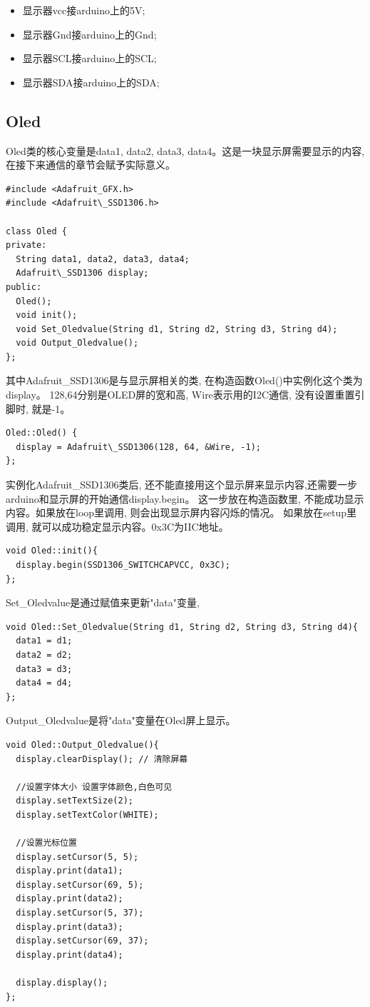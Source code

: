 \documentclass{article}
\begin{document}
\begin{itemize}
	\item 显示器vcc接arduino上的5V;
	\item 显示器Gnd接arduino上的Gnd;
	\item 显示器SCL接arduino上的SCL;
	\item 显示器SDA接arduino上的SDA;
\end{itemize}


\subsection{Oled}
Oled类的核心变量是data1, data2, data3, data4。这是一块显示屏需要显示的内容, 在接下来通信的章节会赋予实际意义。
\begin{lstlisting}
#include <Adafruit_GFX.h>
#include <Adafruit\_SSD1306.h>

class Oled {
private:
  String data1, data2, data3, data4;
  Adafruit\_SSD1306 display;
public:
  Oled();
  void init();
  void Set_Oledvalue(String d1, String d2, String d3, String d4);
  void Output_Oledvalue();
};
\end{lstlisting}

其中Adafruit\_SSD1306是与显示屏相关的类, 在构造函数Oled()中实例化这个类为display。
128,64分别是OLED屏的宽和高, Wire表示用的I2C通信, 没有设置重置引脚时, 就是-1。
\begin{lstlisting}
Oled::Oled() {
  display = Adafruit\_SSD1306(128, 64, &Wire, -1);
};  
\end{lstlisting}

实例化Adafruit\_SSD1306类后, 还不能直接用这个显示屏来显示内容,还需要一步arduino和显示屏的开始通信display.begin。
这一步放在构造函数里, 不能成功显示内容。如果放在loop里调用, 则会出现显示屏内容闪烁的情况。
如果放在setup里调用, 就可以成功稳定显示内容。0x3C为IIC地址。
\begin{lstlisting}
void Oled::init(){
  display.begin(SSD1306_SWITCHCAPVCC, 0x3C);
};  
\end{lstlisting}

Set\_Oledvalue是通过赋值来更新"data"变量,
\begin{lstlisting}
void Oled::Set_Oledvalue(String d1, String d2, String d3, String d4){
  data1 = d1;
  data2 = d2;
  data3 = d3;
  data4 = d4;
};  
\end{lstlisting}

Output\_Oledvalue是将"data"变量在Oled屏上显示。
\begin{lstlisting}
void Oled::Output_Oledvalue(){
  display.clearDisplay(); // 清除屏幕

  //设置字体大小 设置字体颜色,白色可见
  display.setTextSize(2);
  display.setTextColor(WHITE);

  //设置光标位置 
  display.setCursor(5, 5);
  display.print(data1);
  display.setCursor(69, 5);
  display.print(data2);
  display.setCursor(5, 37);
  display.print(data3);
  display.setCursor(69, 37);
  display.print(data4);

  display.display(); 
};
\end{lstlisting}
\end{document}
